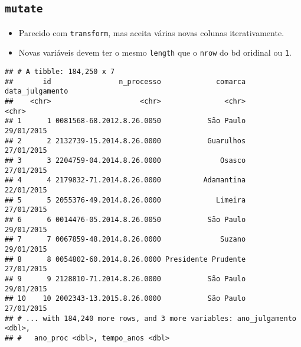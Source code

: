 \documentclass[]{book}
\newenvironment{Shaded}{\begin{snugshade}}{\end{snugshade}}
\newcommand{\KeywordTok}[1]{\textcolor[rgb]{0.13,0.29,0.53}{\textbf{{#1}}}}
\newcommand{\DataTypeTok}[1]{\textcolor[rgb]{0.13,0.29,0.53}{{#1}}}
\newcommand{\DecValTok}[1]{\textcolor[rgb]{0.00,0.00,0.81}{{#1}}}
\newcommand{\StringTok}[1]{\textcolor[rgb]{0.31,0.60,0.02}{{#1}}}
\newcommand{\NormalTok}[1]{{#1}}
\providecommand{\tightlist}{%
  \setlength{\itemsep}{0pt}\setlength{\parskip}{0pt}}
\begin{document}
\subsection{\texorpdfstring{\texttt{mutate}}{mutate}}\label{mutate}

\begin{itemize}
\tightlist
\item
  Parecido com \texttt{transform}, mas aceita várias novas colunas
  iterativamente.
\item
  Novas variáveis devem ter o mesmo \texttt{length} que o \texttt{nrow}
  do bd oridinal ou \texttt{1}.
\end{itemize}

\begin{Shaded}
\end{Shaded}

\begin{verbatim}
## # A tibble: 184,250 x 7
##       id                n_processo             comarca data_julgamento
##    <chr>                     <chr>               <chr>           <chr>
## 1      1 0081568-68.2012.8.26.0050           São Paulo      29/01/2015
## 2      2 2132739-15.2014.8.26.0000           Guarulhos      27/01/2015
## 3      3 2204759-04.2014.8.26.0000              Osasco      27/01/2015
## 4      4 2179832-71.2014.8.26.0000          Adamantina      22/01/2015
## 5      5 2055376-49.2014.8.26.0000             Limeira      27/01/2015
## 6      6 0014476-05.2014.8.26.0050           São Paulo      29/01/2015
## 7      7 0067859-48.2014.8.26.0000              Suzano      29/01/2015
## 8      8 0054802-60.2014.8.26.0000 Presidente Prudente      27/01/2015
## 9      9 2128810-71.2014.8.26.0000           São Paulo      29/01/2015
## 10    10 2002343-13.2015.8.26.0000           São Paulo      27/01/2015
## # ... with 184,240 more rows, and 3 more variables: ano_julgamento <dbl>,
## #   ano_proc <dbl>, tempo_anos <dbl>
\end{verbatim}
\end{document}
